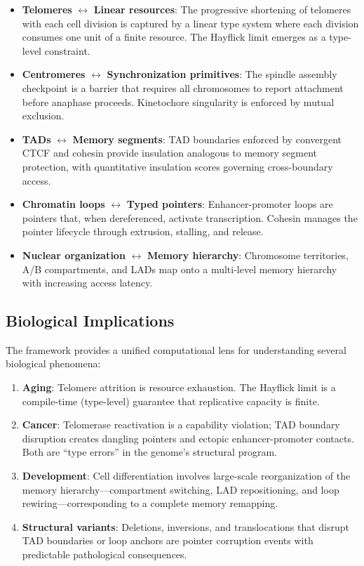 \documentclass[12pt,a4paper]{article}
\theoremstyle{plain}
\theoremstyle{definition}
\begin{document}
\begin{itemize}
  \item \textbf{Telomeres} $\longleftrightarrow$ \textbf{Linear resources}: The progressive shortening of telomeres with each cell division is captured by a linear type system where each division consumes one unit of a finite resource. The Hayflick limit emerges as a type-level constraint.
  \item \textbf{Centromeres} $\longleftrightarrow$ \textbf{Synchronization primitives}: The spindle assembly checkpoint is a barrier that requires all chromosomes to report attachment before anaphase proceeds. Kinetochore singularity is enforced by mutual exclusion.
  \item \textbf{TADs} $\longleftrightarrow$ \textbf{Memory segments}: TAD boundaries enforced by convergent CTCF and cohesin provide insulation analogous to memory segment protection, with quantitative insulation scores governing cross-boundary access.
  \item \textbf{Chromatin loops} $\longleftrightarrow$ \textbf{Typed pointers}: Enhancer-promoter loops are pointers that, when dereferenced, activate transcription. Cohesin manages the pointer lifecycle through extrusion, stalling, and release.
  \item \textbf{Nuclear organization} $\longleftrightarrow$ \textbf{Memory hierarchy}: Chromosome territories, A/B compartments, and LADs map onto a multi-level memory hierarchy with increasing access latency.
\end{itemize}

\subsection{Biological Implications}

The framework provides a unified computational lens for understanding several biological phenomena:

\begin{enumerate}[label=(\roman*)]
  \item \textbf{Aging}: Telomere attrition is resource exhaustion. The Hayflick limit is a compile-time (type-level) guarantee that replicative capacity is finite.
  \item \textbf{Cancer}: Telomerase reactivation is a capability violation; TAD boundary disruption creates dangling pointers and ectopic enhancer-promoter contacts. Both are ``type errors'' in the genome's structural program.
  \item \textbf{Development}: Cell differentiation involves large-scale reorganization of the memory hierarchy---compartment switching, LAD repositioning, and loop rewiring---corresponding to a complete memory remapping.
  \item \textbf{Structural variants}: Deletions, inversions, and translocations that disrupt TAD boundaries or loop anchors are pointer corruption events with predictable pathological consequences.
\end{enumerate}
\end{document}
